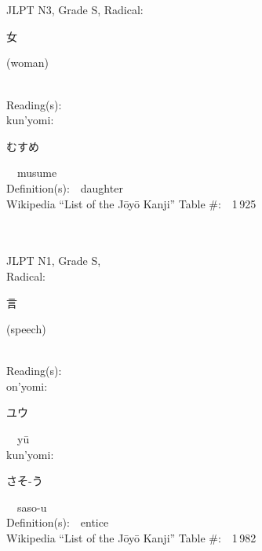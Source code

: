 \begin{multicols}{2}
\ \ \\
{\fontsize{34pt}{40pt}  }\ \ \\  %
{JLPT N3, Grade S, Radical:\ \ {\begin{CJK}{UTF8}{min} 女 \end{CJK}} (woman) } \\
Reading(s):\ \ \\
{\hspace*{1em}}kun'yomi:\ \ \\
{\hspace*{2em}}{\begin{CJK}{UTF8}{min} むすめ \end{CJK}}\ \ musume\ \ \\
Definition(s):\ \ daughter \\
Wikipedia ``List of the J\=oy\=o Kanji'' Table \#:\ \ 1\,925 \\
\ \ \\
{\fontsize{34pt}{40pt}  }\ \ \\
{JLPT N1, Grade S, \\Radical:\ \ {\begin{CJK}{UTF8}{min} 言 \end{CJK}} (speech) } \\
Reading(s):\ \ \\
{\hspace*{1em}}on'yomi:\ \ \\
{\hspace*{2em}}{\begin{CJK}{UTF8}{min} ユウ \end{CJK}}\ \ y\=u\ \ \\
{\hspace*{1em}}kun'yomi:\ \ \\
{\hspace*{2em}}{\begin{CJK}{UTF8}{min} さそ-う \end{CJK}}\ \ saso-u\ \ \\
Definition(s):\ \ entice \\
Wikipedia ``List of the J\=oy\=o Kanji'' Table \#:\ \ 1\,982 \\
\ \ \\
{\fontsize{34pt}{40pt}  }\ \ \\

\end{multicols}
